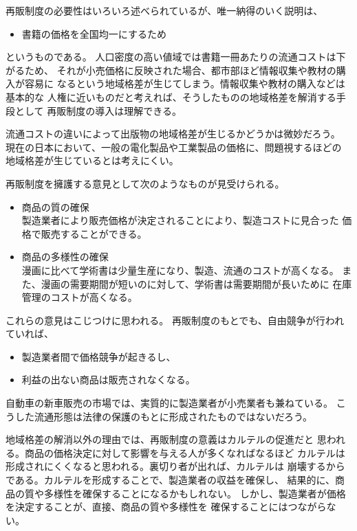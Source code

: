 	再販制度の必要性はいろいろ述べられているが、唯一納得のいく説明は、
	\begin{itemize}\setlength{\itemsep}{-1mm} %
		\item 書籍の価格を全国均一にするため
	\end{itemize} %
	というものである。 
	人口密度の高い値域では書籍一冊あたりの流通コストは下がるため、
	それが小売価格に反映された場合、都市部ほど情報収集や教材の購入が容易に
	なるという地域格差が生じてしまう。情報収集や教材の購入などは基本的な
	人権に近いものだと考えれば、そうしたものの地域格差を解消する手段として
	再販制度の導入は理解できる。
	
	\begin{todo}[地域格差の解消]\label{todo:地域格差の解消} %
		流通コストの違いによって出版物の地域格差が生じるかどうかは微妙だろう。
		現在の日本において、一般の電化製品や工業製品の価格に、問題視するほどの
		地域格差が生じているとは考えにくい。
	\end{todo} %

	再販制度を擁護する意見として次のようなものが見受けられる。
	\begin{itemize}\setlength{\itemsep}{-1mm} %
		\item 商品の質の確保　\\
		製造業者により販売価格が決定されることにより、製造コストに見合った
		価格で販売することができる。
		\item 商品の多様性の確保　\\
		漫画に比べて学術書は少量生産になり、製造、流通のコストが高くなる。
		また、漫画の需要期間が短いのに対して、学術書は需要期間が長いために
		在庫管理のコストが高くなる。
	\end{itemize} %
	これらの意見はこじつけに思われる。
	再販制度のもとでも、自由競争が行われていれば、
	\begin{itemize}\setlength{\itemsep}{-1mm} %
		\item 製造業者間で価格競争が起きるし、
		\item 利益の出ない商品は販売されなくなる。
	\end{itemize} %
	自動車の新車販売の市場では、実質的に製造業者が小売業者も兼ねている。
	こうした流通形態は法律の保護のもとに形成されたものではないだろう。

	地域格差の解消以外の理由では、再販制度の意義はカルテルの促進だと
	思われる。商品の価格決定に対して影響を与える人が多くなればなるほど
	カルテルは形成されにくくなると思われる。裏切り者が出れば、カルテルは
	崩壊するからである。カルテルを形成することで、製造業者の収益を確保し、
	結果的に、商品の質や多様性を確保することになるかもしれない。
	しかし、製造業者が価格を決定することが、直接、商品の質や多様性を
	確保することにはつながらない。
	
